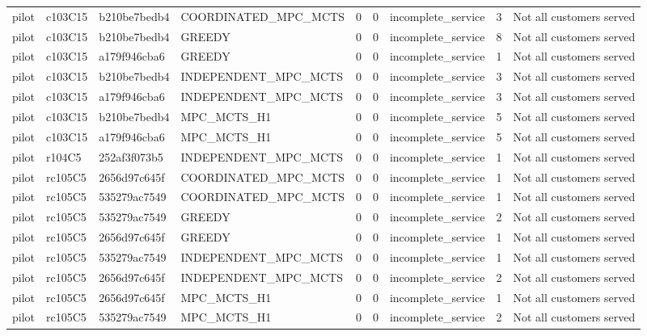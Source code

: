 \begin{table}
{\begin{tabular}{llllrrlrl}
pilot & c103C15 & b210be7bedb4 & COORDINATED\_MPC\_MCTS & 0 & 0 & incomplete\_service & 3 & Not all customers served \\
pilot & c103C15 & b210be7bedb4 & GREEDY & 0 & 0 & incomplete\_service & 8 & Not all customers served \\
pilot & c103C15 & a179f946cba6 & GREEDY & 0 & 0 & incomplete\_service & 1 & Not all customers served \\
pilot & c103C15 & b210be7bedb4 & INDEPENDENT\_MPC\_MCTS & 0 & 0 & incomplete\_service & 3 & Not all customers served \\
pilot & c103C15 & a179f946cba6 & INDEPENDENT\_MPC\_MCTS & 0 & 0 & incomplete\_service & 3 & Not all customers served \\
pilot & c103C15 & b210be7bedb4 & MPC\_MCTS\_H1 & 0 & 0 & incomplete\_service & 5 & Not all customers served \\
pilot & c103C15 & a179f946cba6 & MPC\_MCTS\_H1 & 0 & 0 & incomplete\_service & 5 & Not all customers served \\
pilot & r104C5 & 252af3f073b5 & INDEPENDENT\_MPC\_MCTS & 0 & 0 & incomplete\_service & 1 & Not all customers served \\
pilot & rc105C5 & 2656d97c645f & COORDINATED\_MPC\_MCTS & 0 & 0 & incomplete\_service & 1 & Not all customers served \\
pilot & rc105C5 & 535279ac7549 & COORDINATED\_MPC\_MCTS & 0 & 0 & incomplete\_service & 1 & Not all customers served \\
pilot & rc105C5 & 535279ac7549 & GREEDY & 0 & 0 & incomplete\_service & 2 & Not all customers served \\
pilot & rc105C5 & 2656d97c645f & GREEDY & 0 & 0 & incomplete\_service & 1 & Not all customers served \\
pilot & rc105C5 & 535279ac7549 & INDEPENDENT\_MPC\_MCTS & 0 & 0 & incomplete\_service & 1 & Not all customers served \\
pilot & rc105C5 & 2656d97c645f & INDEPENDENT\_MPC\_MCTS & 0 & 0 & incomplete\_service & 2 & Not all customers served \\
pilot & rc105C5 & 2656d97c645f & MPC\_MCTS\_H1 & 0 & 0 & incomplete\_service & 1 & Not all customers served \\
pilot & rc105C5 & 535279ac7549 & MPC\_MCTS\_H1 & 0 & 0 & incomplete\_service & 2 & Not all customers served \\
\bottomrule
\end{tabular}
}
\end{table}
